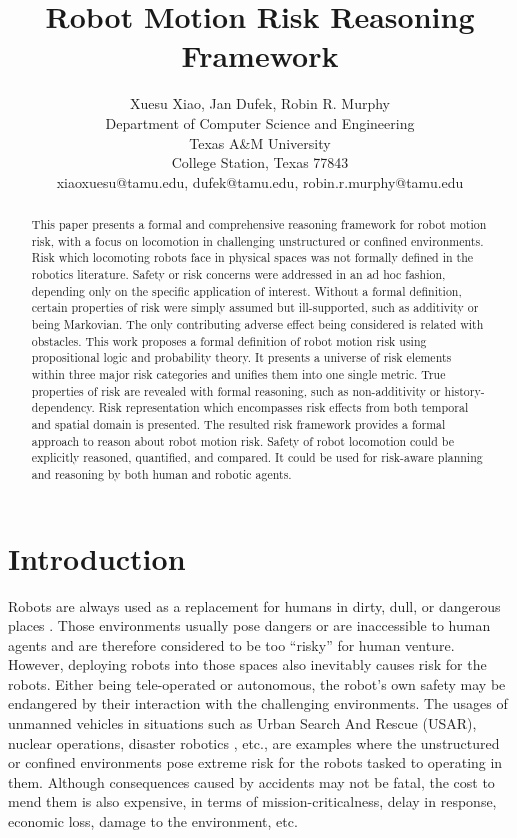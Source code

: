 \documentclass[letterpaper]{article} %
\title{Robot Motion Risk Reasoning Framework}
\author{Xuesu Xiao, Jan Dufek, Robin R. Murphy\\ %
Department of Computer Science and Engineering\\Texas A\&M University\\ %
College Station, Texas 77843\\
xiaoxuesu@tamu.edu, dufek@tamu.edu, robin.r.murphy@tamu.edu %
}
\begin{document}
\maketitle

\begin{abstract}
This paper presents a formal and comprehensive reasoning framework for robot motion risk, with a focus on locomotion in challenging unstructured or confined environments. Risk which locomoting robots face in physical spaces was not formally defined in the robotics literature. Safety or risk concerns were addressed in an ad hoc fashion, depending only on the specific application of interest. Without a formal definition, certain properties of risk were simply assumed but ill-supported, such as additivity or being Markovian. The only contributing adverse effect being considered is related with obstacles. This work proposes a formal definition of robot motion risk using propositional logic and probability theory. It presents a universe of risk elements within three major risk categories and unifies them into one single metric. True properties of risk are revealed with formal reasoning, such as non-additivity or history-dependency. Risk representation which encompasses risk effects from both temporal and spatial domain is presented. The resulted risk framework provides a formal approach to reason about robot motion risk. Safety of robot locomotion could be explicitly reasoned, quantified, and compared. It could be used for risk-aware planning and reasoning by both human and robotic agents. 
\end{abstract}

\section{Introduction}
Robots are always used as a replacement for humans in dirty, dull, or dangerous places \cite{murphy2000introduction}. Those environments usually pose dangers or are inaccessible to human agents and are therefore considered to be too ``risky'' for human venture. However, deploying robots into those spaces also inevitably causes risk for the robots. Either being tele-operated or autonomous, the robot's own safety may be endangered by their interaction with the challenging environments. The usages of unmanned vehicles in situations such as Urban Search And Rescue (USAR), nuclear operations, disaster robotics \cite{murphy2014disaster}, etc., are examples where the unstructured or confined environments pose extreme risk for the robots tasked to operating in them. Although consequences caused by accidents may not be fatal, the cost to mend them is also expensive, in terms of mission-criticalness, delay in response, economic loss, damage to the environment, etc. 
\end{document}
